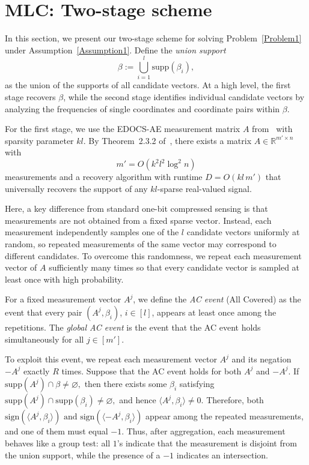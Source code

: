 \documentclass[10pt,a4paper]{amsart}
\newcommand{\supp}{\mathrm{supp}}
\newcommand{\sign}{\mathrm{sign}}
\begin{document}
\section{MLC: Two-stage scheme}\label{sec:2SUMLC} 
In this section, we present our two-stage scheme for solving Problem~\ref{Problem1} under Assumption~\ref{Assumption1}. Define the \emph{union support}
\[
\beta:=\bigcup_{i=1}^{l}\supp(\beta_i),
\]
as the union of the supports of all candidate vectors. At a high level, the first stage recovers $\beta$, while the second stage identifies individual candidate vectors by analyzing the frequencies of single coordinates and coordinate pairs within $\beta$.

For the first stage, we use the EDOCS-AE measurement matrix $A$ from~\cite{li2025support} with sparsity parameter $kl$. By Theorem~2.3.2 of~\cite{li2025support}, there exists a matrix $A\in\mathbb{R}^{m'\times n}$ with
\[
m'=O(k^2l^2\log^2 n)
\]
measurements and a recovery algorithm with runtime $D=O(kl\,m')$ that universally recovers the support of any $kl$-sparse real-valued signal.

Here, a key difference from standard one-bit compressed sensing is that measurements are not obtained from a fixed sparse vector. Instead, each measurement independently samples one of the $l$ candidate vectors uniformly at random, so repeated measurements of the same vector may correspond to different candidates. To overcome this randomness, we repeat each measurement vector of $A$ sufficiently many times so that every candidate vector is sampled at least once with high probability.

For a fixed measurement vector $A^j$, we define the \emph{AC event} (All Covered) as the event that every pair $(A^j,\beta_i)$, $i\in[l]$, appears at least once among the repetitions. The \emph{global AC event} is the event that the AC event holds simultaneously for all $j\in[m']$.

To exploit this event, we repeat each measurement vector $A^j$ and its negation $-A^j$ exactly $R$ times. Suppose that the AC event holds for both $A^j$ and $-A^j$. If
\(
\supp(A^j)\cap\beta\neq\varnothing,
\)
then there exists some $\beta_i$ satisfying
\(
\supp(A^j)\cap\supp(\beta_i)\neq\varnothing,
\)
and hence $\langle A^j,\beta_i\rangle\neq0$. Therefore, both
\(
\sign(\langle A^j,\beta_i\rangle) \text{ and }
\sign(\langle -A^j,\beta_i\rangle)
\)
appear among the repeated measurements, and one of them must equal $-1$. Thus, after aggregation, each measurement behaves like a group test: all $1$'s indicate that the measurement is disjoint from the union support, while the presence of a $-1$ indicates an intersection.
\end{document}
